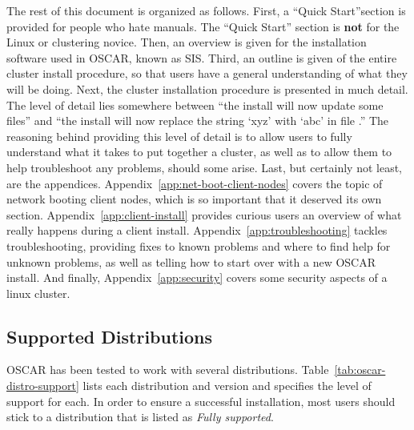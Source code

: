 The rest of this document is organized as follows.  First, a ``Quick
Start''section is provided for people who hate manuals.  The ``Quick
Start'' section is {\bf not} for the Linux or clustering novice. Then,
an overview is given for the installation software used in OSCAR,
known as SIS.  Third, an outline is given of the entire cluster
install procedure, so that users have a general understanding of what
they will be doing.  Next, the cluster installation procedure is
presented in much detail.  The level of detail lies somewhere between
``the install will now update some files'' and ``the install will now
replace the string `xyz' with `abc' in file .'' The
reasoning behind providing this level of detail is to allow users to
fully understand what it takes to put together a cluster, as well as
to allow them to help troubleshoot any problems, should some arise.
Last, but certainly not least, are the appendices.
Appendix~\ref{app:net-boot-client-nodes} covers the topic of network
booting client nodes, which is so important that it deserved its own
section.  Appendix~\ref{app:client-install} provides curious users an
overview of what really happens during a client install.
Appendix~\ref{app:troubleshooting} tackles troubleshooting, providing
fixes to known problems and where to find help for unknown problems,
as well as telling how to start over with a new OSCAR install.  And
finally, Appendix~\ref{app:security} covers some security aspects of a
linux cluster.

\subsection{Supported Distributions}

OSCAR has been tested to work with several distributions.
Table~\ref{tab:oscar-distro-support} lists each distribution and
version and specifies the level of support for each. In order to
ensure a successful installation, most users should stick to a
distribution that is listed as \emph{Fully supported}.



